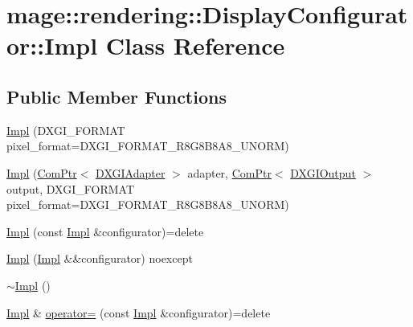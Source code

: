 \hypertarget{classmage_1_1rendering_1_1_display_configurator_1_1_impl}{}\section{mage\+:\+:rendering\+:\+:Display\+Configurator\+:\+:Impl Class Reference}
\label{classmage_1_1rendering_1_1_display_configurator_1_1_impl}
\subsection*{Public Member Functions}
\begin{DoxyCompactItemize}
\item 
\hyperlink{classmage_1_1rendering_1_1_display_configurator_1_1_impl_af2385f84a5d80cf92a1d6afe2343a872}{Impl} (D\+X\+G\+I\+\_\+\+F\+O\+R\+M\+AT pixel\+\_\+format=D\+X\+G\+I\+\_\+\+F\+O\+R\+M\+A\+T\+\_\+\+R8\+G8\+B8\+A8\+\_\+\+U\+N\+O\+RM)
\item 
\hyperlink{classmage_1_1rendering_1_1_display_configurator_1_1_impl_ad71f98da03418a9afcfaa8acf94a0da9}{Impl} (\hyperlink{namespacemage_ae74f374780900893caa5555d1031fd79}{Com\+Ptr}$<$ \hyperlink{namespacemage_1_1rendering_ad55e028ebd705b547eeb972ad8d03b6a}{D\+X\+G\+I\+Adapter} $>$ adapter, \hyperlink{namespacemage_ae74f374780900893caa5555d1031fd79}{Com\+Ptr}$<$ \hyperlink{namespacemage_1_1rendering_aaf22d3893277a4bd8497f6ea69b01532}{D\+X\+G\+I\+Output} $>$ output, D\+X\+G\+I\+\_\+\+F\+O\+R\+M\+AT pixel\+\_\+format=D\+X\+G\+I\+\_\+\+F\+O\+R\+M\+A\+T\+\_\+\+R8\+G8\+B8\+A8\+\_\+\+U\+N\+O\+RM)
\item 
\hyperlink{classmage_1_1rendering_1_1_display_configurator_1_1_impl_acf8b6a3749108ad9f7a7c14c291d48b6}{Impl} (const \hyperlink{classmage_1_1rendering_1_1_display_configurator_1_1_impl}{Impl} \&configurator)=delete
\item 
\hyperlink{classmage_1_1rendering_1_1_display_configurator_1_1_impl_af8ddd060b24cd09deb2beef7737f5277}{Impl} (\hyperlink{classmage_1_1rendering_1_1_display_configurator_1_1_impl}{Impl} \&\&configurator) noexcept
\item 
\hyperlink{classmage_1_1rendering_1_1_display_configurator_1_1_impl_a499b92d9d77a4c31cbdefa3a3c22a0be}{$\sim$\+Impl} ()
\item 
\hyperlink{classmage_1_1rendering_1_1_display_configurator_1_1_impl}{Impl} \& \hyperlink{classmage_1_1rendering_1_1_display_configurator_1_1_impl_afaffb2c4689dd48c195d2a7f12c11e0b}{operator=} (const \hyperlink{classmage_1_1rendering_1_1_display_configurator_1_1_impl}{Impl} \&configurator)=delete

\end{DoxyCompactItemize}
